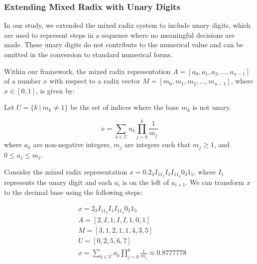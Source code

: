 \subsubsection{Extending Mixed Radix with Unary Digits}
\label{section_definitions_unary_mixed_radix}

In our study, we extended the mixed radix system to include unary digits,
which are used to represent steps in a sequence where no meaningful decisions are made.
These unary digits do not contribute to the numerical value and can be omitted in the conversion to standard numerical forms.

Within our framework, the mixed radix representation $A=[a_{0},a_{1},a_{2},...,a_{n-1}]$ 
of a number $x$ with respect to a radix vector $M=[m_{0},m_{1},m_{2},...,m_{n-1}]$,
where $x \in [0,1]$, is given by:

Let  $U = \{ k \ |\ m_k \neq 1 \} $ be the set of indices where the base \( m_k \) is not unary.

\begin{equation}
    \label{eq:unary_mixed_radix}
	x = \sum_{k \in U} u_{k} \prod_{j=0}^{k} \frac{1}{m_j}
\end{equation}
where $a_k$ are non-negative integers, $m_j$ are integers such that $m_j \geq 1$, and $0 \leq a_j \leq m_j$.

Consider the mixed radix representation $x=0.2_{3}I_11_{2}I_1I_11_{4}0_{3}1_{5}$, where $I_1$ represents the unary digit and each $a_{i}$ is on the left of $a_{i+1}$. We can transform
$x$ to the decimal base using the following steps:

\begin{align}
    & x=2_{3}I_11_{2}I_1I_11_{4}0_{3}1_{5}\\
    & A=[2,I,1,I,I,1,0,1]\\
    & M=[3,1,2,1,1,4,3,5]\\
    & U=[0,2,5,6,7]\\
    & x = \sum_{k \in U} a_{k} \prod_{j=0}^{k} \frac{1}{m_j} \approx 0.8777778
\end{align}
